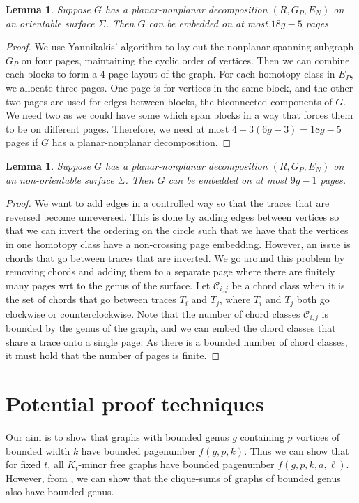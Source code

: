 \documentclass[]{report}
\newtheorem{lemma}[theorem]{Lemma}
\theoremstyle{definition}
\numberwithin{theorem}{section}
\numberwithin{equation}{section}
\begin{document}
\begin{lemma}\label{lem:planar_nonplanar_orientable}
	Suppose $G$ has a planar-nonplanar decomposition $(R, G_P, E_N)$ on an orientable surface $\Sigma$. Then $G$ can be embedded on at most $18g - 5$ pages.
\end{lemma}
\begin{proof}
	We use Yannikakis' algorithm to lay out the nonplanar spanning subgraph $G_P$ on four pages, maintaining the cyclic order of vertices. Then we can combine each blocks to form a 4 page layout of the graph. For each homotopy class in $E_P$, we allocate three pages. One page is for vertices in the same block, and the other two pages are used for edges between blocks, the biconnected components of $G$. We need two as we could have some which span blocks in a way that forces them to be on different pages. Therefore, we need at most $4 + 3(6g - 3) = 18g-5$ pages if $G$ has a planar-nonplanar decomposition. 
\end{proof}

\begin{lemma}\label{lem:planar_nonplanar_nonorientable}
	Suppose $G$ has a planar-nonplanar decomposition $(R, G_P, E_N)$ on an non-orientable surface $\Sigma$. Then $G$ can be embedded on at most $9g - 1$ pages.
\end{lemma}
\begin{proof}
We want to add edges in a controlled way so that the traces that are reversed become unreversed. This is done by adding edges between vertices so that we can invert the ordering on the circle such that we have that the vertices in one homotopy class have a non-crossing page embedding. However, an issue is chords that go between traces that are inverted. We go around this problem by removing chords and adding them to a separate page where there are finitely many pages wrt to the genus of the surface. Let $\mathcal{C}_{i,j}$ be a chord class when it is the set of chords that go between traces $T_i$ and $T_j$, where $T_i$ and $T_j$ both go clockwise or counterclockwise. Note that the number of chord classes $\mathcal{C}_{i,j}$ is bounded by the genus of the graph, and we can embed the chord classes that share a trace onto a single page. As there is a bounded number of chord classes, it must hold that the number of pages is finite. 
\end{proof}


\chapter{Potential proof techniques}\label{chap:Proving_The_Theorem}
Our aim is to show that graphs with bounded genus $g$ containing $p$ vortices of bounded width $k$ have bounded pagenumber $f(g, p, k)$. Thus we can show that for fixed $t$, all $K_t$-minor free graphs have bounded pagenumber $f(g, p, k, a, \ell)$. However, from \cite{hickingbothamStackNumberCliqueSum2023}, we can show that the clique-sums of graphs of bounded genus also have bounded genus.
\end{document}
